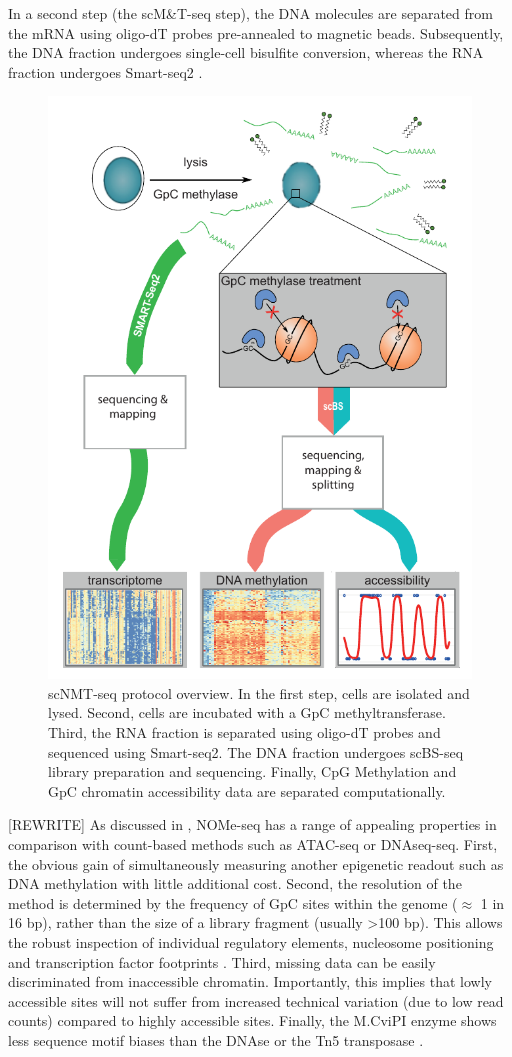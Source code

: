 In a second step (the scM\&T-seq step), the DNA molecules are separated from the mRNA using oligo-dT probes pre-annealed to magnetic beads. Subsequently, the DNA fraction undergoes single-cell bisulfite conversion\cite{Smallwood2014}, whereas the RNA fraction undergoes Smart-seq2 \cite{Picelli2014}.\\

\begin{figure}[H]
	\centering
	\includegraphics[width=0.6\linewidth]{scNMT_protocol}
	\caption[]{scNMT-seq protocol overview. In the first step, cells are isolated and lysed. Second, cells are incubated with a GpC methyltransferase. Third, the RNA fraction is separated using oligo-dT probes and sequenced using Smart-seq2. The DNA fraction undergoes scBS-seq library preparation and sequencing. Finally, CpG Methylation and GpC chromatin accessibility data are separated computationally.}
	\label{fig:scnmt_protocol}
\end{figure}

[REWRITE] As discussed in , NOMe-seq has a range of appealing properties in comparison with count-based methods such as ATAC-seq or DNAseq-seq. First, the obvious gain of simultaneously measuring another epigenetic readout such as DNA methylation with little additional cost. Second, the resolution of the method is determined by the frequency of GpC sites within the genome ($\approx$ 1 in 16 bp), rather than the size of a library fragment (usually >100 bp). This allows the robust inspection of individual regulatory elements, nucleosome positioning and transcription factor footprints \cite{Kelly2012,Pott2016,Nordstrom2019}. Third, missing data can be easily discriminated from inaccessible chromatin. Importantly, this implies that lowly accessible sites will not suffer from increased technical variation (due to low read counts) compared to highly accessible sites. Finally, the M.CviPI enzyme shows less sequence motif biases than the DNAse or the Tn5 transposase \cite{Nordstrom2019}.

